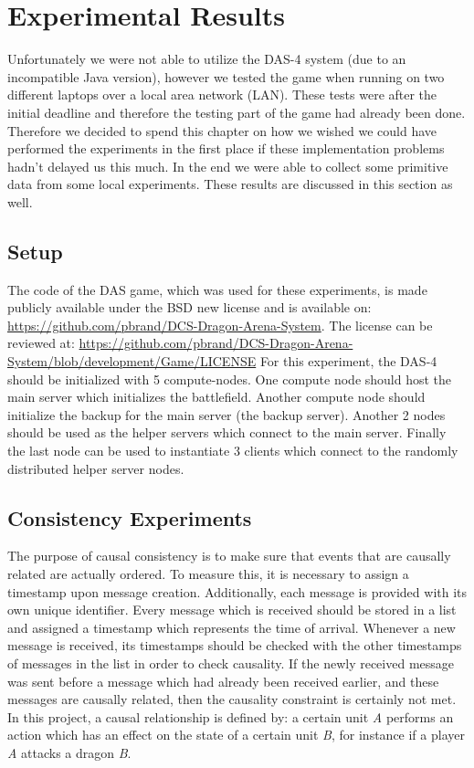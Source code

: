 \section{Experimental Results}
Unfortunately we were not able to utilize the DAS-4 system (due to an incompatible Java version), however we tested the game when running on two different laptops over a local area network (LAN). These tests were after the initial deadline and therefore the testing part of the game had already been done. Therefore we decided to spend this chapter on how we wished we could have performed the experiments in the first place if these implementation problems hadn't delayed us this much. 
In the end we were able to collect some primitive data from some local experiments. 
These results are discussed in this section as well.

\subsection{Setup}
The code of the DAS game, which was used for these experiments, is made publicly available under the BSD new license and is available on: \url{https://github.com/pbrand/DCS-Dragon-Arena-System}. 
The license can be reviewed at: \url{https://github.com/pbrand/DCS-Dragon-Arena-System/blob/development/Game/LICENSE}
For this experiment, the DAS-4 should be initialized with 5 compute-nodes. 
One compute node should host the main server which initializes the battlefield. 
Another compute node should initialize the backup for the main server (the backup server). 
Another 2 nodes should be used as the helper servers which connect to the main server. 
Finally the last node can be used to instantiate 3 clients which connect to the randomly distributed helper server nodes.

\subsection{Consistency Experiments}
The purpose of causal consistency is to make sure that events that are causally related are actually ordered. 
To measure this, it is necessary to assign a timestamp upon message creation. 
Additionally, each message is provided with its own unique identifier. 
Every message which is received should be stored in a list and assigned a timestamp which represents the time of arrival.
Whenever a new message is received, its timestamps should be checked with the other timestamps of messages in the list in order to check causality. If the newly received message was sent before a message which had already been received earlier, and these messages are causally related, then the causality constraint is certainly not met.
In this project, a causal relationship is defined by: a certain unit \emph{A} performs an action which has an effect on the state of a certain unit \emph{B}, for instance if a player \emph{A} attacks a dragon \emph{B}.

